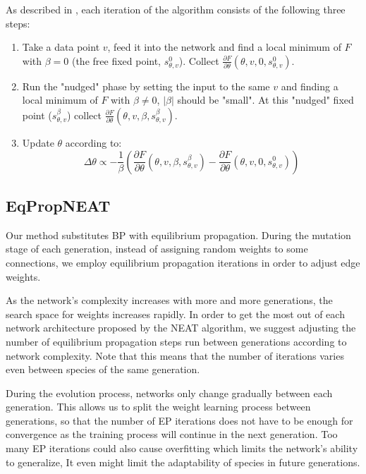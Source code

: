 \documentclass[lettersize,journal]{IEEEtran}
\newcommand{\eqprop}{EP }
\begin{document}
        As described in \cite{eqprop}, each iteration of the algorithm consists of the following three steps:
        \begin{enumerate}
            \item Take a data point $v$, feed it into the network and find a local minimum of $F$ with $\beta=0$ (the free fixed point, $s_{\theta,v}^0$). Collect $\frac{\partial F}{\partial\theta}(\theta,v,0,s_{\theta,v}^0)$.
            \item Run the "nudged" phase by setting the input to the same $v$ and finding a local minimum of $F$ with $\beta\neq0$, $|\beta|$ should be "small". At this "nudged" fixed point ($s_{\theta,v}^\beta$) collect $\frac{\partial F}{\partial \theta}(\theta,v,\beta,s_{\theta,v}^\beta)$.
            \item Update $\theta$ according to:$$\Delta\theta\propto -\frac{1}{\beta}\left(\frac{\partial F}{\partial \theta}\left(\theta,v,\beta,s_{\theta,v}^\beta\right) - \frac{\partial F}{\partial\theta}\left(\theta,v,0,s_{\theta,v}^0\right)\right)$$
        \end{enumerate}
  
		\subsection{EqPropNEAT}
		Our method substitutes BP with equilibrium propagation. During the mutation stage of each generation, instead of assigning random weights to some connections, we employ equilibrium propagation iterations in order to adjust edge weights.
		
		As the network's complexity increases with more and more generations, the search space for weights increases rapidly. In order to get the most out of each network architecture proposed by the NEAT algorithm, we suggest adjusting the number of equilibrium propagation steps run between generations according to network complexity. Note that this means that the number of iterations varies even between species of the same generation. 
        
        During the evolution process, networks only change gradually between each generation. This allows us to split the weight learning process between generations, so that the number of \eqprop iterations does not have to be enough for convergence as the training process will continue in the next generation. Too many \eqprop iterations could also cause overfitting which limits the network's ability to generalize, It even might limit the adaptability of species in future generations. 
		
\end{document}
